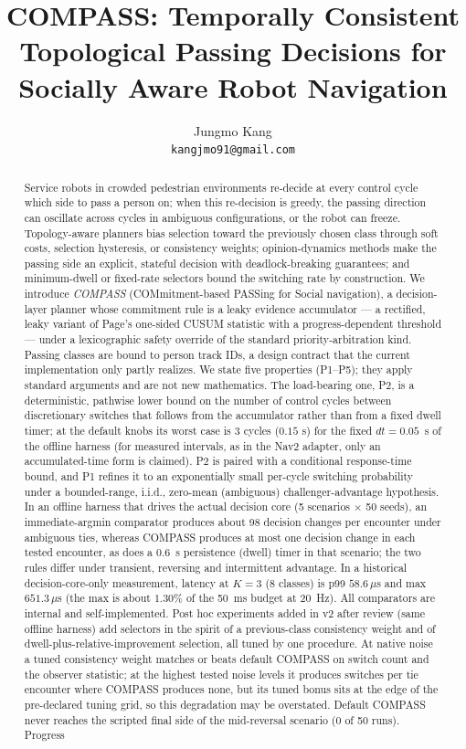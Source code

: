 \documentclass[11pt]{article}
\title{COMPASS: Temporally Consistent Topological Passing Decisions for Socially Aware Robot Navigation}
\author{Jungmo Kang \\ \texttt{kangjmo91@gmail.com}}
\date{}
\begin{document}
\maketitle

\begin{abstract}
Service robots in crowded pedestrian environments re-decide at every control cycle which side to pass a person on; when this re-decision is greedy, the passing direction can oscillate across cycles in ambiguous configurations, or the robot can freeze. Topology-aware planners bias selection toward the previously chosen class through soft costs, selection hysteresis, or consistency weights; opinion-dynamics methods make the passing side an explicit, stateful decision with deadlock-breaking guarantees; and minimum-dwell or fixed-rate selectors bound the switching rate by construction. We introduce \emph{COMPASS} (COMmitment-based PASSing for Social navigation), a decision-layer planner whose commitment rule is a leaky evidence accumulator --- a rectified, leaky variant of Page's one-sided CUSUM statistic with a progress-dependent threshold --- under a lexicographic safety override of the standard priority-arbitration kind. Passing classes are bound to person track IDs, a design contract that the current implementation only partly realizes. We state five properties (P1--P5); they apply standard arguments and are not new mathematics. The load-bearing one, P2, is a deterministic, pathwise lower bound on the number of control cycles between discretionary switches that follows from the accumulator rather than from a fixed dwell timer; at the default knobs its worst case is $3$ cycles ($0.15$ s) for the fixed $dt=0.05$~s of the offline harness (for measured intervals, as in the Nav2 adapter, only an accumulated-time form is claimed). P2 is paired with a conditional response-time bound, and P1 refines it to an exponentially small per-cycle switching probability under a bounded-range, i.i.d., zero-mean (ambiguous) challenger-advantage hypothesis. In an offline harness that drives the actual decision core (5 scenarios $\times$ 50 seeds), an immediate-argmin comparator produces about 98 decision changes per encounter under ambiguous ties, whereas COMPASS produces at most one decision change in each tested encounter, as does a 0.6~s persistence (dwell) timer in that scenario; the two rules differ under transient, reversing and intermittent advantage. In a historical decision-core-only measurement, latency at $K=3$ (8 classes) is p99 $58.6\,\mu$s and max $651.3\,\mu$s (the max is about $1.30\%$ of the 50~ms budget at 20~Hz). All comparators are internal and self-implemented. Post hoc experiments added in v2 after review (same offline harness) add selectors in the spirit of a previous-class consistency weight and of dwell-plus-relative-improvement selection, all tuned by one procedure. At native noise a tuned consistency weight matches or beats default COMPASS on switch count and the observer statistic; at the highest tested noise levels it produces switches per tie encounter where COMPASS produces none, but its tuned bonus sits at the edge of the pre-declared tuning grid, so this degradation may be overstated. Default COMPASS never reaches the scripted final side of the mid-reversal scenario (0 of 50 runs). Progress 
\end{abstract}
\end{document}
